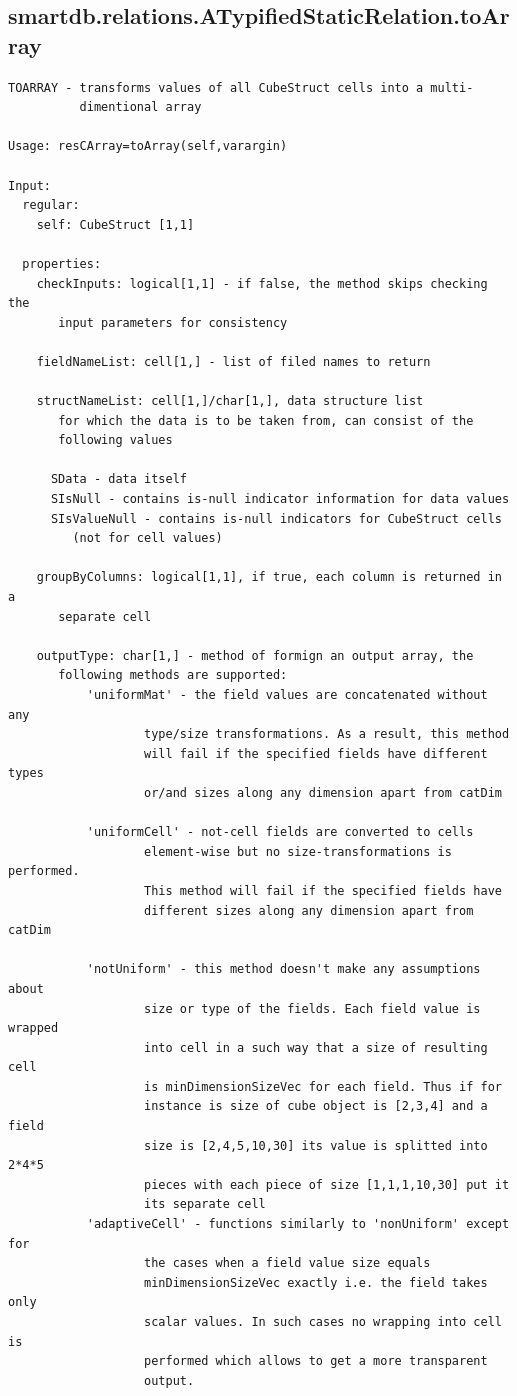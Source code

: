 \documentclass[letterpaper,10pt,english]{sphinxmanual}
\begin{document}
\subsection{smartdb.relations.ATypifiedStaticRelation.toArray}
\label{chap_functions:smartdb-relations-atypifiedstaticrelation-toarray}
\begin{Verbatim}[commandchars=\\\{\}]
TOARRAY - transforms values of all CubeStruct cells into a multi-
          dimentional array

Usage: resCArray=toArray(self,varargin)

Input:
  regular:
    self: CubeStruct [1,1]

  properties:
    checkInputs: logical[1,1] - if false, the method skips checking the
       input parameters for consistency

    fieldNameList: cell[1,] - list of filed names to return

    structNameList: cell[1,]/char[1,], data structure list
       for which the data is to be taken from, can consist of the
       following values

      SData - data itself
      SIsNull - contains is-null indicator information for data values
      SIsValueNull - contains is-null indicators for CubeStruct cells
         (not for cell values)

    groupByColumns: logical[1,1], if true, each column is returned in a
       separate cell

    outputType: char[1,] - method of formign an output array, the
       following methods are supported:
           'uniformMat' - the field values are concatenated without any
                   type/size transformations. As a result, this method
                   will fail if the specified fields have different types
                   or/and sizes along any dimension apart from catDim

           'uniformCell' - not-cell fields are converted to cells
                   element-wise but no size-transformations is performed.
                   This method will fail if the specified fields have
                   different sizes along any dimension apart from catDim

           'notUniform' - this method doesn't make any assumptions about
                   size or type of the fields. Each field value is wrapped
                   into cell in a such way that a size of resulting cell
                   is minDimensionSizeVec for each field. Thus if for
                   instance is size of cube object is [2,3,4] and a field
                   size is [2,4,5,10,30] its value is splitted into 2*4*5
                   pieces with each piece of size [1,1,1,10,30] put it
                   its separate cell
           'adaptiveCell' - functions similarly to 'nonUniform' except for
                   the cases when a field value size equals
                   minDimensionSizeVec exactly i.e. the field takes only
                   scalar values. In such cases no wrapping into cell is
                   performed which allows to get a more transparent
                   output.


\end{Verbatim}
\end{document}
